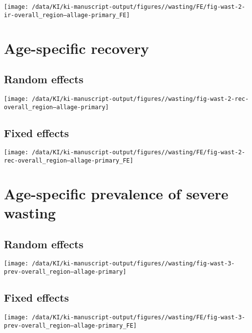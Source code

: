\documentclass[
  9pt,
]{book}
\begin{document}
\texttt{[image: /data/KI/ki-manuscript-output/figures//wasting/FE/fig-wast-2-ir-overall\_region--allage-primary\_FE]}

\hypertarget{age-specific-recovery}{%
\section{Age-specific recovery}\label{age-specific-recovery}}

\hypertarget{random-effects-3}{%
\subsection{Random effects}\label{random-effects-3}}

\texttt{[image: /data/KI/ki-manuscript-output/figures//wasting/fig-wast-2-rec-overall\_region--allage-primary]}

\hypertarget{fixed-effects-4}{%
\subsection{Fixed effects}\label{fixed-effects-4}}

\texttt{[image: /data/KI/ki-manuscript-output/figures//wasting/FE/fig-wast-2-rec-overall\_region--allage-primary\_FE]}

\hypertarget{age-specific-prevalence-of-severe-wasting}{%
\section{Age-specific prevalence of severe wasting}\label{age-specific-prevalence-of-severe-wasting}}

\hypertarget{random-effects-4}{%
\subsection{Random effects}\label{random-effects-4}}

\texttt{[image: /data/KI/ki-manuscript-output/figures//wasting/fig-wast-3-prev-overall\_region--allage-primary]}

\hypertarget{fixed-effects-5}{%
\subsection{Fixed effects}\label{fixed-effects-5}}

\texttt{[image: /data/KI/ki-manuscript-output/figures//wasting/FE/fig-wast-3-prev-overall\_region--allage-primary\_FE]}
\end{document}
